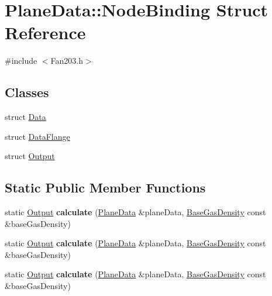 \hypertarget{struct_plane_data_1_1_node_binding}{}\section{Plane\+Data\+:\+:Node\+Binding Struct Reference}
\label{struct_plane_data_1_1_node_binding}


{\ttfamily \#include $<$Fan203.\+h$>$}

\subsection*{Classes}
\begin{DoxyCompactItemize}
\item 
struct \hyperlink{struct_plane_data_1_1_node_binding_1_1_data}{Data}
\item 
struct \hyperlink{struct_plane_data_1_1_node_binding_1_1_data_flange}{Data\+Flange}
\item 
struct \hyperlink{struct_plane_data_1_1_node_binding_1_1_output}{Output}
\end{DoxyCompactItemize}
\subsection*{Static Public Member Functions}
\begin{DoxyCompactItemize}
\item 
\mbox{\label{struct_plane_data_1_1_node_binding_a50084489fc0b1ad5048226c2f04e1d49}} 
static \hyperlink{struct_plane_data_1_1_node_binding_1_1_output}{Output} {\bfseries calculate} (\hyperlink{class_plane_data}{Plane\+Data} \&plane\+Data, \hyperlink{class_base_gas_density}{Base\+Gas\+Density} const \&base\+Gas\+Density)
\item 
\mbox{\label{struct_plane_data_1_1_node_binding_a50084489fc0b1ad5048226c2f04e1d49}} 
static \hyperlink{struct_plane_data_1_1_node_binding_1_1_output}{Output} {\bfseries calculate} (\hyperlink{class_plane_data}{Plane\+Data} \&plane\+Data, \hyperlink{class_base_gas_density}{Base\+Gas\+Density} const \&base\+Gas\+Density)
\item 
\mbox{\label{struct_plane_data_1_1_node_binding_a50084489fc0b1ad5048226c2f04e1d49}} 
static \hyperlink{struct_plane_data_1_1_node_binding_1_1_output}{Output} {\bfseries calculate} (\hyperlink{class_plane_data}{Plane\+Data} \&plane\+Data, \hyperlink{class_base_gas_density}{Base\+Gas\+Density} const \&base\+Gas\+Density)
\end{DoxyCompactItemize}



